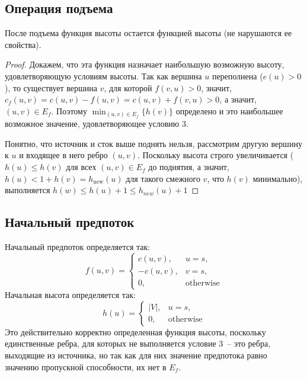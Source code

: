 \subsection{Операция подъема}
\begin{algorithm}
	\DontPrintSemicolon
\end{algorithm}
\begin{lemma}
	После подъема функция высоты остается функцией высоты (не нарушаются ее свойства).
\end{lemma}
\begin{proof}
	Докажем, что эта функция назначает наибольшую возможную высоту, удовлетворяющую условиям высоты. Так как вершина $u$ переполнена ($e(u)>0$), то существует вершина $v$, для которой $f(v,u)>0$, значит, $c_f(u,v)=c(u,v)-f(u,v)=c(u,v)+f(v,u)>0$, а значит, $(u,v)\in E_f$. Поэтому $\min_{(u,v)\in E_f}\{h(v)\}$ определено и это наибольшее возможное значение, удовлетворяющее условию 3.

	Понятно, что источник и сток выше поднять нельзя, рассмотрим другую вершину к $u$ и входящее в него ребро $(u,v)$. Поскольку высота строго увеличивается ($h(u)\le h(v)$ для всех $(u,v)\in E_f$ до поднятия, а значит, $h(u)<1+h(v)=h_\mathrm{new}(u)$ для такого смежного $v$, что $h(v)$ минимально), выполняется $h(w)\le h(u)+1\le h_{new}(u)+1$
\end{proof}

\subsection{Начальный предпоток}
Начальный предпоток определяется так:
$$
f(u,v)=\begin{cases}
	c(u,v), & u=s,\\
	-c(u,v), & v=s,\\
	0, & \mathrm{otherwise}
\end{cases}
$$
Начальная высота определяется так:
$$
h(u)=\begin{cases}
	|V|, & u=s,\\
	0, & \mathrm{otherwise}
\end{cases}
$$
Это действительно корректно определенная функция высоты, поскольку единственные ребра, для которых не выполняется условие 3~-- это ребра, выходящие из источника, но так как для них значение предпотока равно значению пропускной способности, их нет в $E_f$.

